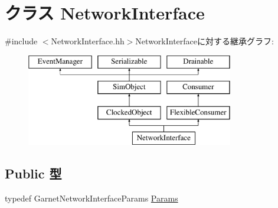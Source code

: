 \hypertarget{classNetworkInterface}{
\section{クラス NetworkInterface}
\label{classNetworkInterface}
}


{\ttfamily \#include $<$NetworkInterface.hh$>$}NetworkInterfaceに対する継承グラフ:\begin{figure}[H]
\begin{center}
\leavevmode
\includegraphics[height=4cm]{classNetworkInterface}
\end{center}
\end{figure}
\subsection*{Public 型}
\begin{DoxyCompactItemize}
\item 
typedef GarnetNetworkInterfaceParams \hyperlink{classNetworkInterface_a24441f24d6be514d5461dd3b86ea9e99}{Params}
\end{DoxyCompactItemize}
